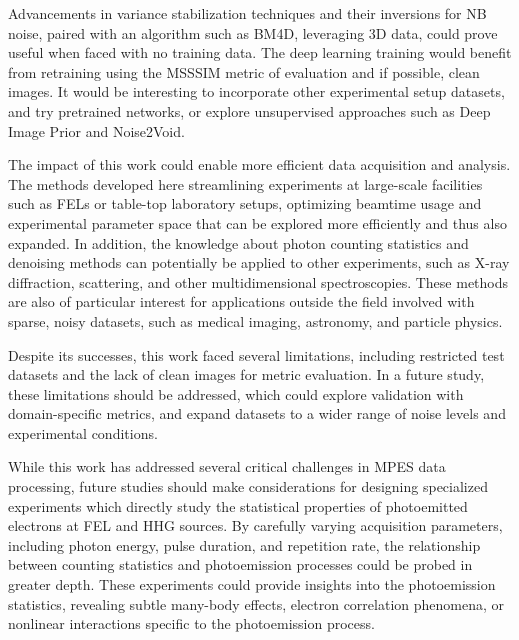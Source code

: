 Advancements in variance stabilization techniques and their inversions for \gls{NB} noise, paired with an algorithm such as BM4D, leveraging 3D data, could prove useful when faced with no training data. The deep learning training would benefit from retraining using the \gls{MSSSIM} metric of evaluation and if possible, clean images. It would be interesting to incorporate other experimental setup datasets, and try pretrained networks, or explore unsupervised approaches such as Deep Image Prior and Noise2Void.

The impact of this work could enable more efficient data acquisition and analysis. The methods developed here streamlining experiments at large-scale facilities such as \glspl{FEL} or table-top laboratory setups, optimizing beamtime usage and experimental parameter space that can be explored more efficiently and thus also expanded. In addition, the knowledge about photon counting statistics and denoising methods can potentially be applied to other experiments, such as X-ray diffraction, scattering, and other multidimensional spectroscopies. These methods are also of particular interest for applications outside the field involved with sparse, noisy datasets, such as medical imaging, astronomy, and particle physics.

Despite its successes, this work faced several limitations, including restricted test datasets and the lack of clean images for metric evaluation. In a future study, these limitations should be addressed, which could explore validation with domain-specific metrics, and expand datasets to a wider range of noise levels and experimental conditions.

While this work has addressed several critical challenges in \gls{MPES} data processing, future studies should make considerations for designing specialized experiments which directly study the statistical properties of photoemitted electrons at \gls{FEL} and \gls{HHG} sources. By carefully varying acquisition parameters, including photon energy, pulse duration, and repetition rate, the relationship between counting statistics and photoemission processes could be probed in greater depth. These experiments could provide insights into the photoemission statistics, revealing subtle many-body effects, electron correlation phenomena, or nonlinear interactions specific to the photoemission process.

